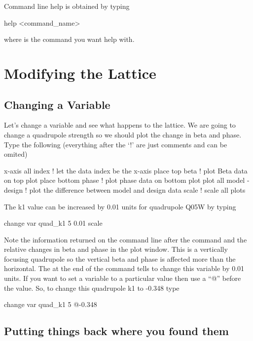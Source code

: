 Command line help is obtained by typing
\begin{example}
  help <command\_name>
\end{example}
where  is the command you want help with.

\section{Modifying the Lattice}
\label{s:modify_lattice}

\subsection{Changing a Variable}
\label{ss:change_variable}

Let's change a variable and see what happens to the lattice. We are going to
change a quadrupole strength so we should plot the change in beta and phase.
Type the following (everything after the `!' are just comments and can be
omited)
\begin{example}
  x-axis all index        ! let the data index be the x-axis
  place top beta          ! plot Beta data on top plot
  place bottom phase      ! plot phase data on bottom plot
  plot all model - design ! plot the difference between model and design data
  scale                   ! scale all plots
\end{example}

The k1 value can be increased by 0.01 units for quadrupole Q05W by typing
\begin{example}
  change var quad\_k1 5 0.01
  scale
\end{example}
Note the information returned on the command line after the command and the relative changes in
beta and phase in the plot window. This is a vertically focusing quadrupole so
the vertical beta and phase is affected more than the horizontal. The 
at the end of the command tells \tao to change this variable by 0.01 units. If
you want to set a variable to a particular value then use a ``@'' before the
value. So, to change this quadrupole k1 to -0.348 type
\begin{example}
  change var quad\_k1 5 @-0.348
\end{example}

\subsection{Putting things back where you found them}
\label{ss:put_it_back}


